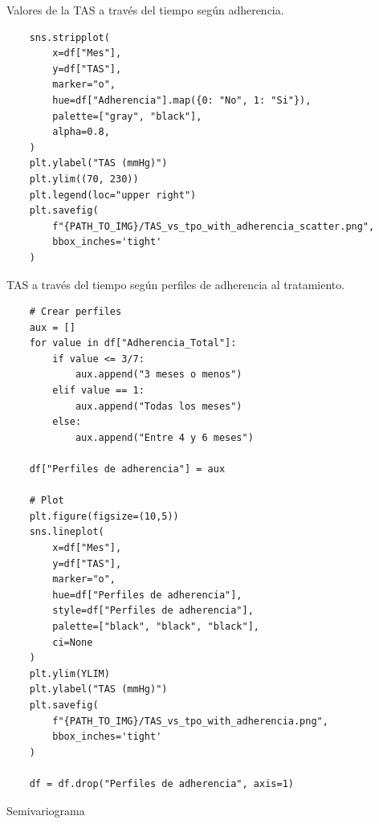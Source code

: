 \documentclass[spanish]{article}
\numberwithin{figure}{subsection}
\numberwithin{equation}{subsection}
\numberwithin{table}{subsection}
\begin{document}
Valores de la TAS a través del tiempo según adherencia.

\begin{lstlisting}
	sns.stripplot(
		x=df["Mes"],
		y=df["TAS"],
		marker="o",
		hue=df["Adherencia"].map({0: "No", 1: "Si"}),
		palette=["gray", "black"],
		alpha=0.8,
	)
	plt.ylabel("TAS (mmHg)")
	plt.ylim((70, 230))
	plt.legend(loc="upper right")
	plt.savefig(
		f"{PATH_TO_IMG}/TAS_vs_tpo_with_adherencia_scatter.png",
		bbox_inches='tight'
	)
\end{lstlisting}

TAS a través del tiempo según perfiles de adherencia al tratamiento.

\begin{lstlisting}
	# Crear perfiles
	aux = []
	for value in df["Adherencia_Total"]:
		if value <= 3/7:
			aux.append("3 meses o menos")
		elif value == 1:
			aux.append("Todas los meses")
		else:
			aux.append("Entre 4 y 6 meses")
	
	df["Perfiles de adherencia"] = aux
	
	# Plot
	plt.figure(figsize=(10,5))
	sns.lineplot(
		x=df["Mes"],
		y=df["TAS"],
		marker="o",
		hue=df["Perfiles de adherencia"],
		style=df["Perfiles de adherencia"],
		palette=["black", "black", "black"],
		ci=None
	)
	plt.ylim(YLIM)
	plt.ylabel("TAS (mmHg)")
	plt.savefig(
		f"{PATH_TO_IMG}/TAS_vs_tpo_with_adherencia.png",
		bbox_inches='tight'
	)
	
	df = df.drop("Perfiles de adherencia", axis=1)
\end{lstlisting}

Semivariograma
\end{document}
